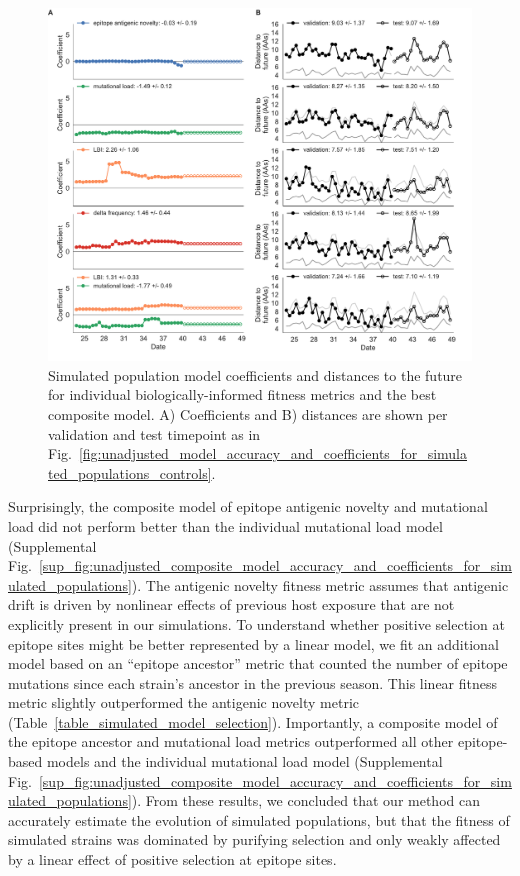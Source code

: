 \begin{figure}[htb]
  \begin{center}
  \includegraphics[width=\textwidth]{figures/unadjusted-model-accuracy-and-coefficients-for-simulated-populations.pdf}
  \caption{
    Simulated population model coefficients and distances to the future for individual biologically-informed fitness metrics and the best composite model.
    A) Coefficients and B) distances are shown per validation and test timepoint as in Fig.~\ref{fig:unadjusted_model_accuracy_and_coefficients_for_simulated_populations_controls}.
  }
  \label{fig:unadjusted_model_accuracy_and_coefficients_for_simulated_populations}
  \end{center}
\end{figure}

Surprisingly, the composite model of epitope antigenic novelty and mutational load did not perform better than the individual mutational load model (Supplemental Fig.~\ref{sup_fig:unadjusted_composite_model_accuracy_and_coefficients_for_simulated_populations}).
The antigenic novelty fitness metric assumes that antigenic drift is driven by nonlinear effects of previous host exposure \cite{Luksza:2014hj} that are not explicitly present in our simulations.
To understand whether positive selection at epitope sites might be better represented by a linear model, we fit an additional model based on an ``epitope ancestor'' metric that counted the number of epitope mutations since each strain's ancestor in the previous season.
This linear fitness metric slightly outperformed the antigenic novelty metric (Table~\ref{table_simulated_model_selection}).
Importantly, a composite model of the epitope ancestor and mutational load metrics outperformed all other epitope-based models and the individual mutational load model (Supplemental Fig.~\ref{sup_fig:unadjusted_composite_model_accuracy_and_coefficients_for_simulated_populations}).
From these results, we concluded that our method can accurately estimate the evolution of simulated populations, but that the fitness of simulated strains was dominated by purifying selection and only weakly affected by a linear effect of positive selection at epitope sites.

